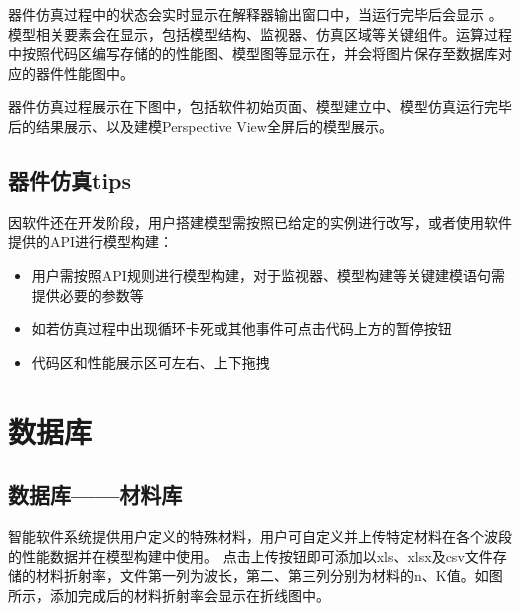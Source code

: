 \documentclass[letterpaper,10pt,english]{sphinxmanual}
\begin{document}
{{\sphinxAtStartPar
器件仿真过程中的状态会实时显示在解释器输出窗口中，当运行完毕后会显示 。模型相关要素会在显示，包括模型结构、监视器、仿真区域等关键组件。运算过程中按照代码区编写存储的的性能图、模型图等显示在，并会将图片保存至数据库对应的器件性能图中。

\sphinxAtStartPar
器件仿真过程展示在下图中，包括软件初始页面、模型建立中、模型仿真运行完毕后的结果展示、以及建模Perspective View全屏后的模型展示。


\sphinxAtStartPar
{}






\subsection{器件仿真tips}
\label{\detokenize{_u8f6f_u4ef6_u6a21_u5757_u4ecb_u7ecd/_u5668_u4ef6_u4eff_u771f/contents:tips}}
\sphinxAtStartPar
因软件还在开发阶段，用户搭建模型需按照已给定的实例进行改写，或者使用软件提供的API进行模型构建：
\begin{itemize}
\item {} 
\sphinxAtStartPar
用户需按照API规则进行模型构建，对于监视器、模型构建等关键建模语句需提供必要的参数等

\item {} 
\sphinxAtStartPar
如若仿真过程中出现循环卡死或其他事件可点击代码上方的暂停按钮

\item {} 
\sphinxAtStartPar
代码区和性能展示区可左右、上下拖拽

\end{itemize}

\sphinxstepscope


\section{数据库}
\label{\detokenize{_u8f6f_u4ef6_u6a21_u5757_u4ecb_u7ecd/_u6570_u636e_u5e93/contents:id1}}\label{\detokenize{_u8f6f_u4ef6_u6a21_u5757_u4ecb_u7ecd/_u6570_u636e_u5e93/contents::doc}}

\subsection{数据库——材料库}
\label{\detokenize{_u8f6f_u4ef6_u6a21_u5757_u4ecb_u7ecd/_u6570_u636e_u5e93/contents:id2}}
\sphinxAtStartPar
智能软件系统提供用户定义的特殊材料，用户可自定义并上传特定材料在各个波段的性能数据并在模型构建中使用。
点击上传按钮即可添加以xls、xlsx及csv文件存储的材料折射率，文件第一列为波长，第二、第三列分别为材料的n、K值。如图所示，添加完成后的材料折射率会显示在折线图中。


}}
\end{document}
